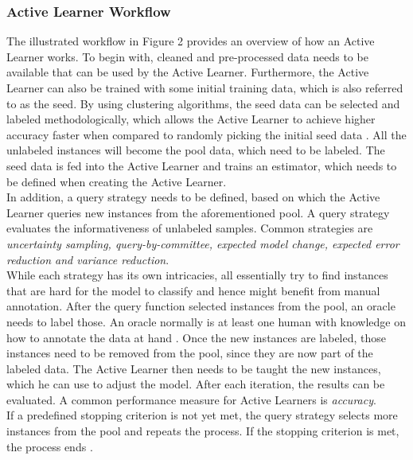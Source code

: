 \documentclass[11pt, a4paper]{article}
\begin{document}
\subsubsection{Active Learner Workflow}
The illustrated workflow in Figure 2 provides an overview of how an Active Learner works. 
To begin with, cleaned and pre-processed data needs to be available that can be used by the Active Learner. 
Furthermore, the Active Learner can also be trained with some initial training data, which is also referred to as the seed. 
By using clustering algorithms, the seed data can be selected and labeled methodologically, which allows the Active Learner to achieve 
higher accuracy faster when compared to randomly picking the initial seed data \citep{kang2004usingclusterbasedsampling}. All the unlabeled 
instances will become the pool data, which need to be labeled. The seed data is fed into the Active Learner and trains an estimator, 
which needs to be defined when creating the Active Learner.\\
In addition, a query strategy needs to be defined, based on which the Active Learner queries new instances from the aforementioned pool. 
A query strategy evaluates the informativeness of unlabeled samples. Common strategies are \emph{uncertainty sampling, query-by-committee, 
expected model change, expected error reduction and variance reduction}. \\
While each strategy has its own intricacies, all essentially try to find instances that are hard for the model to classify and hence might benefit from manual annotation. 
After the query function selected instances from the pool, an oracle needs to label those. An oracle normally is at 
least one human with knowledge on how to annotate the data at hand \citep{settles2009activeLL}. Once the new instances are labeled, 
those instances need to be removed from the pool, since they are now part of the labeled data. The Active Learner then needs 
to be taught the new instances, which he can use to adjust the model. After each iteration, the results can be evaluated. 
A common performance measure for Active Learners is \emph{accuracy}.\\
If a predefined stopping criterion is not yet met, the query strategy selects more instances from the pool and repeats the process.
If the stopping criterion is met, the process ends \citep{lu2019investigating}.
\end{document}
